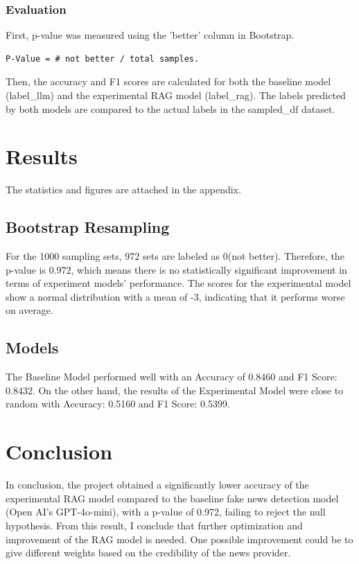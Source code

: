 \documentclass[11pt]{article}
\begin{document}
\subsubsection{Evaluation}
First, p-value was measured using the 'better' column in Bootstrap. 
\begin{verbatim}
P-Value = # not better / total samples.
\end{verbatim}
Then, the accuracy and F1 scores are calculated for both the baseline model (label\_llm) and the experimental RAG model (label\_rag). The labels predicted by both models are compared to the actual labels in the sampled\_df dataset.
\section{Results}
The statistics and figures are attached in the appendix.
\subsection{Bootstrap Resampling}
For the 1000 sampling sets, 972 sets are labeled as 0(not better). Therefore, the p-value is 0.972, which means there is no statistically significant improvement in terms of experiment models' performance. The scores for the experimental model show a normal distribution with a mean of -3, indicating that it performs worse on average.
\subsection{Models}
The Baseline Model performed well with an Accuracy of 0.8460 and F1 Score: 0.8432. On the other hand, the results of the Experimental Model were close to random with Accuracy: 0.5160 and F1 Score: 0.5399.

\section{Conclusion}
In conclusion, the project obtained a significantly lower accuracy of the experimental RAG model compared to the baseline fake news detection model (Open AI's GPT-4o-mini), with a p-value of 0.972, failing to reject the null hypothesis. From this result, I conclude that further optimization and improvement of the RAG model is needed. One possible improvement could be to give different weights based on the credibility of the news provider.




\appendix
\end{document}
